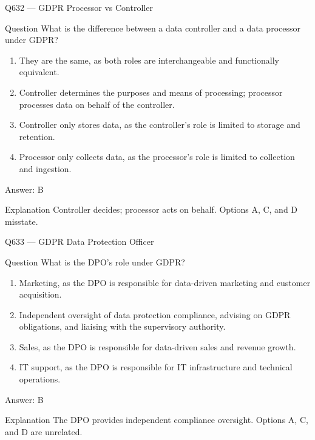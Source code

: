 \documentclass[aspectratio=169,8pt]{beamer}
\begin{document}
	\begin{frame}{Q632 --- GDPR Processor vs Controller}
		\begin{block}{Question}
			What is the difference between a data controller and a data processor under GDPR?
			\begin{enumerate}
				\item They are the same, as both roles are interchangeable and functionally equivalent.
				\item Controller determines the purposes and means of processing; processor processes data on behalf of the controller.
				\item Controller only stores data, as the controller's role is limited to storage and retention.
				\item Processor only collects data, as the processor's role is limited to collection and ingestion.
			\end{enumerate}
		\end{block}
		\begin{exampleblock}{Answer: B}\end{exampleblock}
		\begin{block}{Explanation}
			Controller decides; processor acts on behalf. Options A, C, and D misstate.
		\end{block}
	\end{frame}
	
	\begin{frame}{Q633 --- GDPR Data Protection Officer}
		\begin{block}{Question}
			What is the DPO's role under GDPR?
			\begin{enumerate}
				\item Marketing, as the DPO is responsible for data-driven marketing and customer acquisition.
				\item Independent oversight of data protection compliance, advising on GDPR obligations, and liaising with the supervisory authority.
				\item Sales, as the DPO is responsible for data-driven sales and revenue growth.
				\item IT support, as the DPO is responsible for IT infrastructure and technical operations.
			\end{enumerate}
		\end{block}
		\begin{exampleblock}{Answer: B}\end{exampleblock}
		\begin{block}{Explanation}
			The DPO provides independent compliance oversight. Options A, C, and D are unrelated.
		\end{block}
	\end{frame}
	
\end{document}
